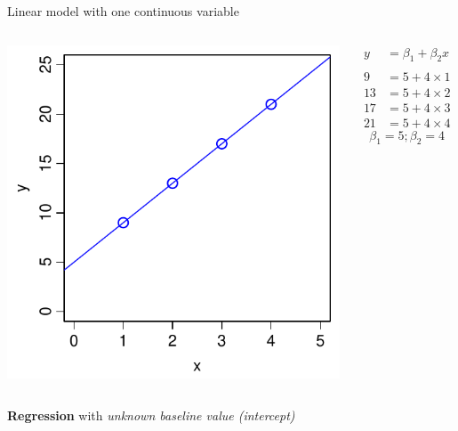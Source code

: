 \documentclass[xcolor=x11names,compress]{beamer}
\renewcommand{\(}{\begin{columns}}
\renewcommand{\)}{\end{columns}}
\newcommand{\<}[1]{\begin{column}{#1}}
\renewcommand{\>}{\end{column}}
\begin{document}
    \begin{frame}{Linear model with one continuous variable}
    
    \begin{columns}[T]
    
            \includegraphics[width=\textwidth]{Intercept.pdf}
            
            \begin{align*}
              y  &= \beta_1 + \beta_2 x \\
              \\
              9  &= 5 + 4 \times 1 \\
              13 &= 5 + 4 \times 2 \\
              17 &= 5 + 4 \times 3 \\
              21 &= 5 + 4 \times 4   
            \end{align*}
            \[\beta_1 = 5; \beta_2=4\]
    \end{columns}
\pause
    \begin{center}
        {\bf Regression} with {\it unknown baseline value (intercept) }
    \end{center}
    
\end{frame}
\end{document}
